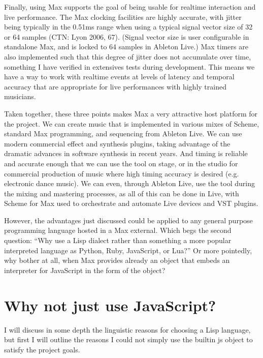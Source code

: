 \documentclass[letterpaper,10pt,english]{sphinxmanual}
\begin{document}
\sphinxAtStartPar
Finally, using Max supports the goal of being usable for real\sphinxhyphen{}time interaction and live performance.
The Max clocking facilities are highly accurate, with jitter being typically in the 0.5\sphinxhyphen{}1ms range when
using a typical signal vector size of 32 or 64 samples (CTN: Lyon 2006, 67).
(Signal vector size is user configurable in standalone Max, and is locked to 64 samples in Ableton Live.)
Max timers are also implemented such that this degree of jitter does not accumulate over time, something
I have verified in extensives tests during development.
This means we have a way to work with realtime events at levels of latency and temporal accuracy that
are appropriate for live performances with highly trained musicians.

\sphinxAtStartPar
Taken together, these three points makes Max a very attractive host platform for the project.
We can create music that is implemented in various mixes of Scheme, standard Max programming, and sequencing from Ableton Live.
We can use modern commercial effect and synthesis plugins, taking advantage of the dramatic advances in software synthesis in recent years.
And timing is reliable and accurate enough that we can use the tool on stage, or in the studio for commercial production of
music where high timing accuracy is desired (e.g. electronic dance music).
We can even, through Ableton Live, use the tool during the mixing and mastering processes, as all of this can be done in Live,
with Scheme for Max used to orchestrate and automate Live devices and VST plugins.

\sphinxAtStartPar
However, the advantages just discussed could be applied to any general purpose programming
language hosted in a Max external.
Which begs the second question: “Why use a Lisp dialect rather than something a more popular interpreted language as Python, Ruby,
JavaScript, or Lua?”
Or more pointedly, why bother at all, when Max provides already an object that embeds an interpreter for JavaScript in the form of
the  object?


\section{Why not just use JavaScript?}
\label{\detokenize{design:why-not-just-use-javascript}}
\sphinxAtStartPar
I will discuss in some depth the linguistic reasons for choosing a Lisp language, but first I will outline the
reasons I could not simply use the built\sphinxhyphen{}in js object to satisfy the project goals.
\end{document}
